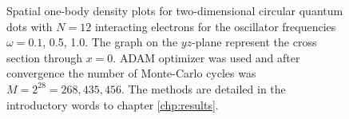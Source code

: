 \begin{landscape}
\begin{figure} [H]
		\caption{Spatial one-body density plots for two-dimensional circular quantum dots with $N=12$ interacting electrons for the oscillator frequencies $\omega=0.1$, 0.5, 1.0. The graph on the $yz$-plane represent the cross section through $x=0$. ADAM optimizer was used and after convergence the number of Monte-Carlo cycles was $M=2^{28}=268,435,456$. The methods are detailed in the introductory words to chapter \ref{chp:results}.}%
		\label{fig:OB2_interaction_12P}
	\end{figure}
	\begin{figure} [H]%
		\centering
		\captionsetup[subfigure]{labelformat=empty}
		\captionsetup{width=0.9\hsize}
		\hspace{0.1cm}
		\hspace{-0.0cm}
		\hspace{-0.0cm}
		\hspace{-0.0cm}
		\\ [-0.3cm]
		

\end{figure}
\end{landscape}
